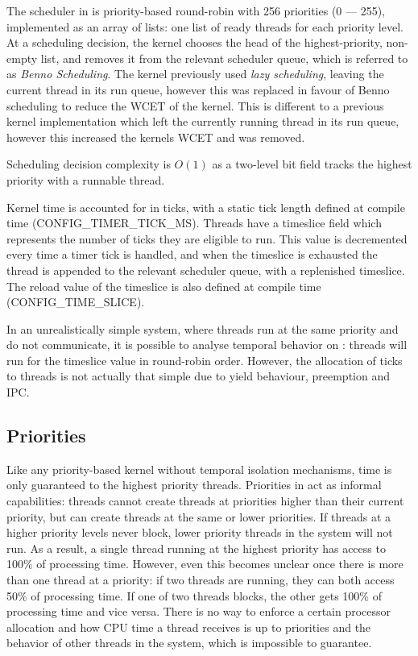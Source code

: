 The scheduler in \selfour is priority-based round-robin with 256 priorities (0 --- 255), implemented as an array of lists: one list of ready threads for each priority level. 
At a scheduling decision, the kernel chooses the head of the highest-priority, non-empty list, and
removes it from the relevant scheduler queue, which is referred to as \emph{Benno Scheduling}.
The kernel previously used \emph{lazy scheduling}, leaving the current thread in its run queue, however this was replaced in favour of Benno scheduling to reduce the WCET of the kernel. 
This is different to a previous kernel implementation which left the currently running thread in its run queue, however this increased the kernels \gls{WCET} and was removed.

Scheduling decision complexity is $O(1)$ as a two-level bit field tracks the highest priority with a runnable thread.

Kernel time is accounted for in ticks, with a static tick length defined at compile time (CONFIG\_TIMER\_TICK\_MS).
Threads have a timeslice field which represents the number of ticks they are eligible to run. 
This value is decremented every time a timer tick is handled, and when the timeslice is exhausted the thread is appended to the relevant scheduler queue, with a replenished timeslice.
The reload value of the timeslice is also defined at compile time (CONFIG\_TIME\_SLICE).

In an unrealistically simple system, where threads run at the same priority and do not communicate, it is possible to analyse temporal behavior on \selfour: threads will run for the timeslice value in round-robin order.
However, the allocation of ticks to threads is not actually that simple due to yield behaviour, preemption and \gls{IPC}. 

\subsection{Priorities}

Like any priority-based kernel without temporal isolation mechanisms, time is only guaranteed to the highest priority threads.
Priorities in \selfour act as informal capabilities: threads cannot create threads at priorities higher than their current priority, but can create threads at the same or lower priorities.
If threads at a higher priority levels never block, lower priority threads in the system will not run.
As a result, a single thread running at the highest priority has access to 100\% of processing time.
However, even this becomes unclear once there is more than one thread at a priority: if two threads are running, they can both access 50\% of processing time.
If one of two threads blocks, the other gets 100\% of processing time and vice versa.
There is no way to enforce a certain processor allocation and how CPU time a thread receives is up to priorities and the behavior of other threads in the system, which is impossible to guarantee.

